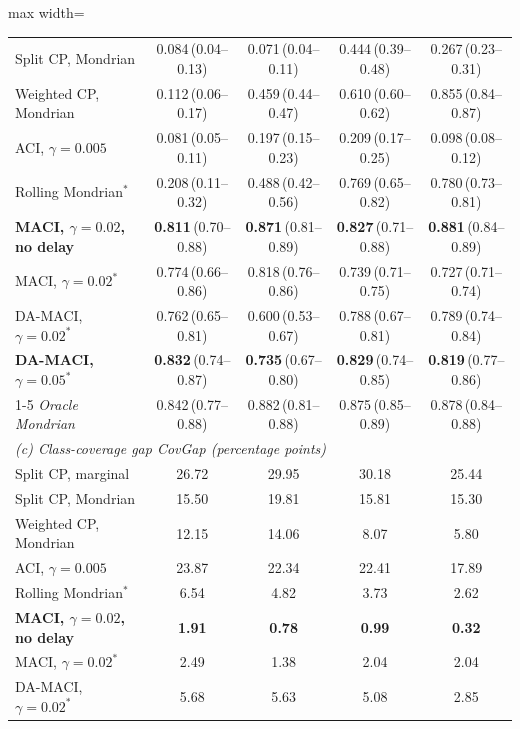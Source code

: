 \begin{table}[!t]
\begin{adjustbox}{max width=\textwidth}
\begin{tabular}{lcccc}
Split CP, Mondrian & 0.084\,{\tiny(0.04--0.13)} & 0.071\,{\tiny(0.04--0.11)} & 0.444\,{\tiny(0.39--0.48)} & 0.267\,{\tiny(0.23--0.31)}\\
Weighted CP, Mondrian & 0.112\,{\tiny(0.06--0.17)} & 0.459\,{\tiny(0.44--0.47)} & 0.610\,{\tiny(0.60--0.62)} & 0.855\,{\tiny(0.84--0.87)}\\
ACI, $\gamma=0.005$ & 0.081\,{\tiny(0.05--0.11)} & 0.197\,{\tiny(0.15--0.23)} & 0.209\,{\tiny(0.17--0.25)} & 0.098\,{\tiny(0.08--0.12)}\\
Rolling Mondrian$^{\ast}$ & 0.208\,{\tiny(0.11--0.32)} & 0.488\,{\tiny(0.42--0.56)} & 0.769\,{\tiny(0.65--0.82)} & 0.780\,{\tiny(0.73--0.81)}\\
\textbf{MACI, $\gamma=0.02$, no delay} & \textbf{0.811}\,{\tiny(0.70--0.88)} & \textbf{0.871}\,{\tiny(0.81--0.89)} & \textbf{0.827}\,{\tiny(0.71--0.88)} & \textbf{0.881}\,{\tiny(0.84--0.89)}\\
MACI, $\gamma=0.02^{\ast}$ & 0.774\,{\tiny(0.66--0.86)} & 0.818\,{\tiny(0.76--0.86)} & 0.739\,{\tiny(0.71--0.75)} & 0.727\,{\tiny(0.71--0.74)}\\
DA-MACI, $\gamma=0.02^{\ast}$ & 0.762\,{\tiny(0.65--0.81)} & 0.600\,{\tiny(0.53--0.67)} & 0.788\,{\tiny(0.67--0.81)} & 0.789\,{\tiny(0.74--0.84)}\\
\textbf{DA-MACI, $\gamma=0.05^{\ast}$} & \textbf{0.832}\,{\tiny(0.74--0.87)} & \textbf{0.735}\,{\tiny(0.67--0.80)} & \textbf{0.829}\,{\tiny(0.74--0.85)} & \textbf{0.819}\,{\tiny(0.77--0.86)}\\
\cmidrule(l){1-5}
\emph{Oracle Mondrian} & 0.842\,{\tiny(0.77--0.88)} & 0.882\,{\tiny(0.81--0.88)} & 0.875\,{\tiny(0.85--0.89)} & 0.878\,{\tiny(0.84--0.88)}\\
\midrule
\multicolumn{5}{l}{\emph{(c) Class-coverage gap CovGap (percentage points)}}\\
Split CP, marginal & 26.72 & 29.95 & 30.18 & 25.44\\
Split CP, Mondrian & 15.50 & 19.81 & 15.81 & 15.30\\
Weighted CP, Mondrian & 12.15 & 14.06 & 8.07 & 5.80\\
ACI, $\gamma=0.005$ & 23.87 & 22.34 & 22.41 & 17.89\\
Rolling Mondrian$^{\ast}$ & 6.54 & 4.82 & 3.73 & 2.62\\
\textbf{MACI, $\gamma=0.02$, no delay} & \textbf{1.91} & \textbf{0.78} & \textbf{0.99} & \textbf{0.32}\\
MACI, $\gamma=0.02^{\ast}$ & 2.49 & 1.38 & 2.04 & 2.04\\
DA-MACI, $\gamma=0.02^{\ast}$ & 5.68 & 5.63 & 5.08 & 2.85\\

\end{tabular}
\end{adjustbox}
\end{table}
